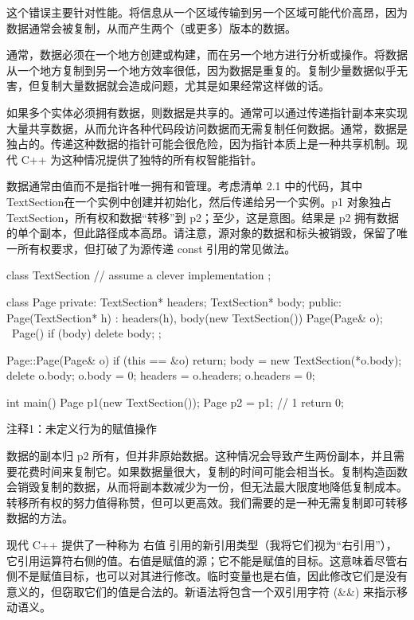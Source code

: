 这个错误主要针对性能。将信息从一个区域传输到另一个区域可能代价高昂，因为数据通常会被复制，从而产生两个（或更多）版本的数据。


通常，数据必须在一个地方创建或构建，而在另一个地方进行分析或操作。将数据从一个地方复制到另一个地方效率很低，因为数据是重复的。复制少量数据似乎无害，但复制大量数据就会造成问题，尤其是如果经常这样做的话。

如果多个实体必须拥有数据，则数据是共享的。通常可以通过传递指针副本来实现大量共享数据，从而允许各种代码段访问数据而无需复制任何数据。通常，数据是独占的。传递这种数据的指针可能会很危险，因为指针本质上是一种共享机制。现代 C++ 为这种情况提供了独特的所有权智能指针。

数据通常由值而不是指针唯一拥有和管理。考虑清单 2.1 中的代码，其中TextSection在一个实例中创建并初始化，然后传递给另一个实例。p1 对象独占 TextSection，所有权和数据“转移”到 p2；至少，这是意图。结果是 p2 拥有数据的单个副本，但此路径成本高昂。请注意，源对象的数据和标头被销毁，保留了唯一所有权要求，但打破了为源传递 const 引用的常见做法。


\begin{cpp}
class TextSection {
  // assume a clever implementation
};

class Page {
private:
  TextSection* headers;
  TextSection* body;
public:
  Page(TextSection* h) : headers(h), body(new TextSection()) {}
  Page(Page& o);
  ~Page() { if (body) delete body; }
};

Page::Page(Page& o) {
  if (this == &o)
    return;
  body = new TextSection(*o.body);
  delete o.body;
  o.body = 0;
  headers = o.headers;
  o.headers = 0;
}

int main() {
  Page p1(new TextSection());
  Page p2 = p1; // 1
  return 0;
}
\end{cpp}

{\footnotesize
注释1：未定义行为的赋值操作
}


数据的副本归 p2 所有，但并非原始数据。这种情况会导致产生两份副本，并且需要花费时间来复制它。如果数据量很大，复制的时间可能会相当长。复制构造函数会销毁复制的数据，从而将副本数减少为一份，但无法最大限度地降低复制成本。转移所有权的努力值得称赞，但可以更高效。我们需要的是一种无需复制即可转移数据的方法。


现代 C++ 提供了一种称为 右值 引用的新引用类型（我将它们视为“右引用”），它引用运算符右侧的值。右值是赋值的源；它不能是赋值的目标。这意味着尽管右侧不是赋值目标，也可以对其进行修改。临时变量也是右值，因此修改它们是没有意义的，但窃取它们的值是合法的。新语法将包含一个双引用字符 (\&\&) 来指示移动语义。

